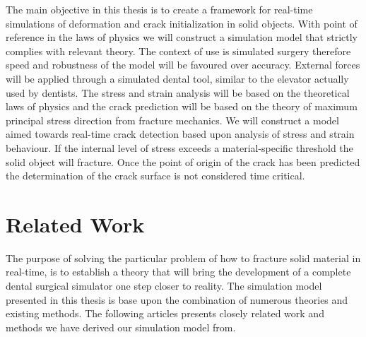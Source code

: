 The main objective in this thesis is to create a framework for
real-time simulations of deformation and crack initialization in solid
objects. 
%
With point of reference in the laws of physics we will
construct a simulation model that strictly complies with relevant
theory. The context of use is simulated surgery therefore speed
and robustness of the model will be favoured over accuracy.
%
External forces will be applied through a simulated dental tool, similar
to the elevator actually used by dentists. 
%
The stress and strain analysis will be based on 
the theoretical laws of physics and the crack prediction will be based on
the theory of maximum principal stress direction from fracture mechanics. 
%
We will construct a model aimed towards real-time crack detection
based upon analysis of stress and strain behaviour. If the
internal level of stress exceeds a material-specific threshold the
solid object will fracture. Once the point of origin of the crack has
been predicted the determination of the crack surface is not
considered time critical.







\section{Related Work}
The purpose of solving the particular problem of how to
fracture solid material in real-time, is to establish a theory 
that will bring the development of a complete dental surgical
simulator one step closer to reality. The simulation model presented
in this thesis is base upon the combination of numerous theories and
existing methods. 
%
The following articles presents closely related work and methods
we have derived our simulation model from. \\

